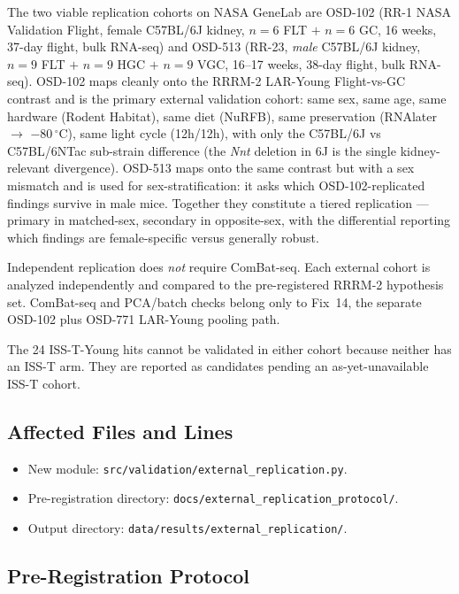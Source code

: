 \documentclass[11pt]{article}
\newcommand{\code}[1]{\texttt{#1}}
\begin{document}
The two viable replication cohorts on NASA GeneLab are OSD-102 (RR-1 NASA Validation Flight, female C57BL/6J kidney, $n{=}6$ FLT $+$ $n{=}6$ GC, 16 weeks, 37-day flight, bulk RNA-seq) and OSD-513 (RR-23, \emph{male} C57BL/6J kidney, $n{=}9$ FLT $+$ $n{=}9$ HGC $+$ $n{=}9$ VGC, 16--17 weeks, 38-day flight, bulk RNA-seq). OSD-102 maps cleanly onto the RRRM-2 LAR-Young Flight-vs-GC contrast and is the primary external validation cohort: same sex, same age, same hardware (Rodent Habitat), same diet (NuRFB), same preservation (RNAlater $\to$ $-80\,^\circ$C), same light cycle (12h/12h), with only the C57BL/6J vs C57BL/6NTac sub-strain difference (the \emph{Nnt} deletion in 6J is the single kidney-relevant divergence). OSD-513 maps onto the same contrast but with a sex mismatch and is used for sex-stratification: it asks which OSD-102-replicated findings survive in male mice. Together they constitute a tiered replication --- primary in matched-sex, secondary in opposite-sex, with the differential reporting which findings are female-specific versus generally robust.

Independent replication does \emph{not} require ComBat-seq. Each external cohort is analyzed independently and compared to the pre-registered RRRM-2 hypothesis set. ComBat-seq and PCA/batch checks belong only to Fix~14, the separate OSD-102 plus OSD-771 LAR-Young pooling path.

The 24 ISS-T-Young hits cannot be validated in either cohort because neither has an ISS-T arm. They are reported as candidates pending an as-yet-unavailable ISS-T cohort.

\subsection{Affected Files and Lines}

\begin{itemize}[leftmargin=*]
\item New module: \code{src/validation/external\_replication.py}.
\item Pre-registration directory: \code{docs/external\_replication\_protocol/}.
\item Output directory: \code{data/results/external\_replication/}.
\end{itemize}

\subsection{Pre-Registration Protocol}
\end{document}
